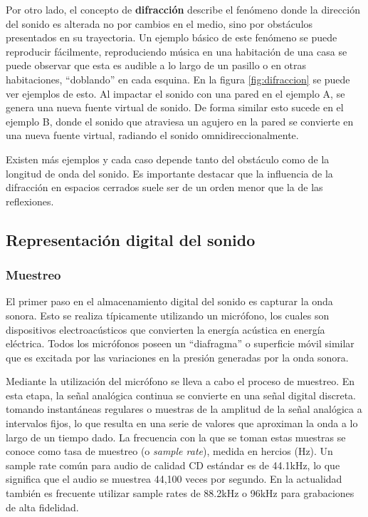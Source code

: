 \documentclass{prgrado}
\begin{document}
Por otro lado, el concepto de \textbf{difracción} describe el fenómeno donde la dirección del sonido es alterada no por cambios en el medio, sino por obstáculos presentados en su trayectoria. Un ejemplo básico de este fenómeno se puede reproducir fácilmente, reproduciendo música en una habitación de una casa se puede observar que esta es audible a lo largo de un pasillo o en otras habitaciones, “doblando” en cada esquina. En la figura \ref{fig:difraccion} se puede ver ejemplos de esto. Al impactar el sonido con una pared en el ejemplo A, se genera una nueva fuente virtual de sonido. De forma similar esto sucede en el ejemplo B, donde el sonido que atraviesa un agujero en la pared se convierte en una nueva fuente virtual, radiando el sonido omnidireccionalmente.

Existen más ejemplos y cada caso depende tanto del obstáculo como de la longitud de onda del sonido. Es importante destacar que la influencia de la difracción en espacios cerrados suele ser de un orden menor que la de las reflexiones. \newline \newline \newline \newline \newline %

\subsection{Representación digital del sonido}

\subsubsection{Muestreo}

El primer paso en el almacenamiento digital del sonido es capturar la onda sonora. Esto se realiza típicamente utilizando un micrófono, los cuales son dispositivos electroacústicos que convierten la energía acústica en energía eléctrica. Todos los micrófonos poseen un “diafragma” o superficie móvil similar que es excitada por las variaciones en la presión generadas por la onda sonora. 

Mediante la utilización del micrófono se lleva a cabo el proceso de muestreo. En esta etapa, la señal analógica continua se convierte en una señal digital discreta. tomando instantáneas regulares o muestras de la amplitud de la señal analógica a intervalos fijos, lo que resulta en una serie de valores que aproximan la onda a lo largo de un tiempo dado. La frecuencia con la que se toman estas muestras se conoce como tasa de muestreo (o \textit{sample rate}), medida en hercios (Hz). Un sample rate común para audio de calidad CD estándar es de 44.1kHz, lo que significa que el audio se muestrea 44,100 veces por segundo. En la actualidad también es frecuente utilizar sample rates de 88.2kHz o 96kHz para grabaciones de alta fidelidad.
\end{document}
